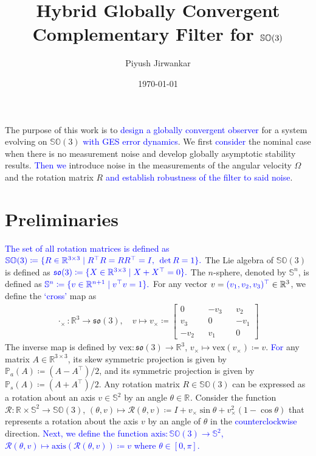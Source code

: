 \documentclass{article}
\title{Hybrid Globally Convergent Complementary Filter for $\SOthree$}
\author{Piyush Jirwankar}
\date{\today}
\newcommand{\SOthree}{\mathbb{SO}(3)}
\newcommand{\sothree}{\mathfrak{so}(3)}
\newcommand{\axis}[1]{\text{axis}(#1)}
\newcommand{\R}[1]{\mathbb{R}^{#1}}
\newcommand{\vex}[1]{\text{vex}\left(#1\right)}
\newcommand{\textblue}[1]{\textcolor{blue}{#1}}
\newcommand{\cross}[1]{{#1}_\times}
\begin{document}
\maketitle

The purpose of this work is to \textblue{design a globally convergent observer} for a system evolving on $\SOthree$ \textblue{with GES error dynamics}. We first \textblue{consider} the nominal case when there is no measurement noise and develop globally asymptotic stability results. \textblue{Then we} introduce noise in the measurements of the angular velocity $\Omega$ and the rotation matrix $R$ \textblue{and establish robustness of the filter to said noise}. 

\section{Preliminaries}


\textblue{The set of all rotation matrices is defined as} $\textblue{\SOthree\coloneqq  \{R\in\R{3\times 3} \mid R^\top R = RR^\top = I,\:\: \det R = 1\}.}$ The Lie algebra of $\SOthree$ is defined as $\textblue{\sothree\coloneqq \{X\in\R{3\times 3}\mid X + X^\top = 0\}.}$
The $n$-sphere, denoted by $\mathbb{S}^n$, is defined as $\textblue{\mathbb{S}^n\coloneqq \{v\in \R{n+1}\mid v^\top v = 1\}.}$
For any vector $v = \textblue{(v_1, v_2, v_3)^\top}\in\R{3}$, we define the \textblue{`cross'} map as 
\begin{align}
    \cross{\cdot} : \R{3}\to \sothree, \quad v \mapsto \cross{v} \coloneqq \begin{bmatrix}
        0 && -v_3 && v_2\\
        v_3 && 0 && -v_1\\
        -v_2 && v_1 && 0
    \end{bmatrix}
\end{align}
The inverse map is defined by $\text{vex} : \sothree \to \R{3}$, $\cross{v} \mapsto \vex{\cross{v}}\coloneqq v$. \textblue{For} any matrix $A\in \R{3\times 3}$, its skew symmetric projection is given by $\mathbb{P}_a(A) \coloneqq (A - A^\top)/2$, and its symmetric projection is given by $\mathbb{P}_s(A) \coloneqq (A + A^\top)/2$. Any rotation matrix $R\in\SOthree$ can be expressed as a rotation about an axis $v\in\mathbb{S}^2$ by an angle $\theta\in\R{}$. Consider the function $\mathcal{R}:\R{}\times \mathbb{S}^2 \to \SOthree$, $(\theta, v)\mapsto \mathcal{R}(\theta, v)\coloneqq I + \cross{v}\sin\theta  + \cross{v}^2(1 - \cos{\theta})$ that represents a rotation about the axis $v$ by an angle of $\theta$ in the \textblue{counterclockwise} direction. \textblue{Next, we define the function $\text{axis} : \SOthree\to \mathbb{S}^2$, $\mathcal{R}(\theta, v)\mapsto \axis{\mathcal{R}(\theta, v)} \coloneqq v$ where $\theta\in [0,\pi]$.}
\end{document}
